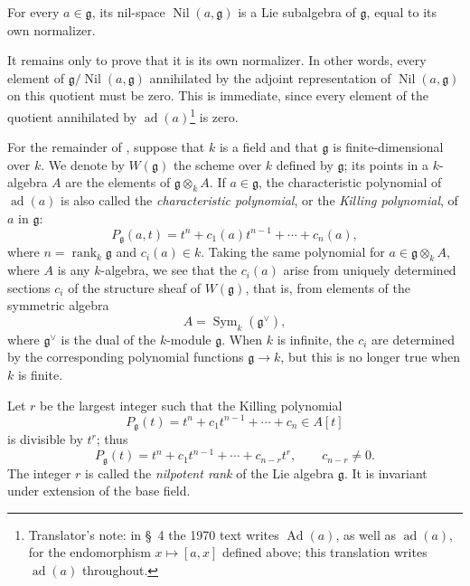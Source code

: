 \begin{proposition}
For every \(a\in\mathfrak g\), its nil-space
\(\operatorname{Nil}(a,\mathfrak g)\) is a Lie subalgebra of
\(\mathfrak g\), equal to its own normalizer.
\end{proposition}

It remains only to prove that it is its own normalizer. In other
words, every element of
\(\mathfrak g/\operatorname{Nil}(a,\mathfrak g)\) annihilated by the
adjoint representation of \(\operatorname{Nil}(a,\mathfrak g)\) on
this quotient must be zero. This is immediate, since every element
of the quotient annihilated by \(\operatorname{ad}(a)\)\footnote{Translator's
note: in \S~4 the 1970 text writes \(\operatorname{Ad}(a)\), as well as
\(\operatorname{ad}(a)\), for the endomorphism \(x\mapsto[a,x]\) defined
above; this translation writes \(\operatorname{ad}(a)\) throughout.} is zero.

For the remainder of , suppose that \(k\) is a field and
that \(\mathfrak g\) is finite-dimensional over \(k\). We denote by
\(W(\mathfrak g)\) the scheme over \(k\) defined by \(\mathfrak g\);
its points in a \(k\)-algebra \(A\) are the elements of
\(\mathfrak g\otimes_k A\). If \(a\in\mathfrak g\), the
characteristic polynomial of \(\operatorname{ad}(a)\) is also called
the \emph{characteristic polynomial}, or the \emph{Killing
polynomial}, of \(a\) in \(\mathfrak g\):
\[
  P_{\mathfrak g}(a,t)
  =
  t^n+c_1(a)t^{n-1}+\cdots+c_n(a),
\]
where \(n=\operatorname{rank}_k\mathfrak g\) and \(c_i(a)\in k\).
Taking the same polynomial for
\(a\in\mathfrak g\otimes_k A\), where \(A\) is any \(k\)-algebra, we
see that the \(c_i(a)\) arise from uniquely determined sections
\(c_i\) of the structure sheaf of \(W(\mathfrak g)\), that is, from
elements of the symmetric algebra
\[
  A=\operatorname{Sym}_k(\mathfrak g^\vee),
\]
where \(\mathfrak g^\vee\) is the dual of the \(k\)-module
\(\mathfrak g\). When \(k\) is infinite, the \(c_i\) are determined
by the corresponding polynomial functions \(\mathfrak g\to k\), but
this is no longer true when \(k\) is finite.

Let \(r\) be the largest integer such that the Killing polynomial
\[
  P_{\mathfrak g}(t)
  =
  t^n+c_1t^{n-1}+\cdots+c_n
  \in A[t]
\]
is divisible by \(t^r\); thus
\[
  P_{\mathfrak g}(t)
  =
  t^n+c_1t^{n-1}+\cdots+c_{n-r}t^r,
  \qquad c_{n-r}\neq0.
\]
The integer \(r\) is called the \emph{nilpotent rank} of the Lie
algebra \(\mathfrak g\). It is invariant under extension of the base
field.

